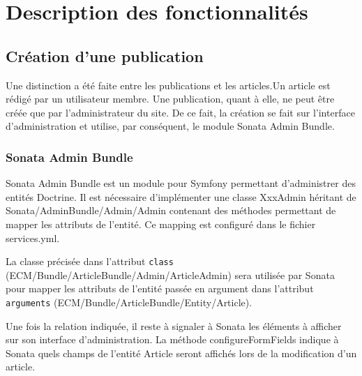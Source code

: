 \documentclass[a4paper,12pt, notitlepage]{report}
\begin{document}
\section{Description des fonctionnalités}
\subsection{Création d'une publication}
Une distinction a été faite entre les publications et les articles.Un article est rédigé par un utilisateur membre. Une publication, quant à elle, ne peut être créée que par l'administrateur du site. De ce fait, la création se fait sur l'interface d'administration et utilise, par conséquent, le module Sonata Admin Bundle.
\subsubsection{Sonata Admin Bundle}
Sonata Admin Bundle est un module pour Symfony permettant d'administrer des entités Doctrine. Il est nécessaire d'implémenter une classe XxxAdmin héritant de Sonata/AdminBundle/Admin/Admin contenant des méthodes permettant de mapper les attributs de l'entité. Ce mapping est configuré dans le fichier services.yml.

La classe précisée dans l'attribut \verb?class? (ECM/Bundle/ArticleBundle/Admin/ArticleAdmin) sera utilisée par Sonata pour mapper les attributs de l'entité passée en argument dans l'attribut \verb?arguments? (ECM/Bundle/ArticleBundle/Entity/Article).

Une fois la relation indiquée, il reste à signaler à Sonata les éléments à afficher sur son interface d'administration. La méthode configureFormFields indique à Sonata quels champs de l'entité Article seront affichés lors de la modification d'un article.
\end{document}
